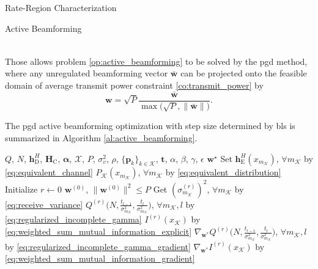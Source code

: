 \documentclass[journal]{IEEEtran}
\begin{document}
\begin{section}{Rate-Region Characterization}
\begin{subsection}{Active Beamforming}
\begin{figure*}[!b]
\begin{align}
				\label{eq:weighted_sum_mutual_information_gradient}
			\end{align}
		\end{figure*}
		Those allows problem \eqref{op:active_beamforming} to be solved by the \gls{pgd} method, where any unregulated beamforming vector $\bar{\boldsymbol{w}}$ can be projected onto the feasible domain of average transmit power constraint \eqref{co:transmit_power} by
		\begin{equation}
			\boldsymbol{w} = \sqrt{P} \frac{\bar{\boldsymbol{w}}}{\max\bigl(\sqrt{P},\lVert\bar{\boldsymbol{w}}\rVert\bigr)}.
			\label{eq:beamforming_projection}
		\end{equation}

		The \gls{pgd} active beamforming optimization with step size determined by \gls{bls} is summarized in Algorithm \ref{al:active_beamforming}.
		\begin{algorithm}[!t]
			\caption{Iterative Active Beamforming Optimization by \gls{pgd} with \gls{bls}}
			\label{al:active_beamforming}
			\begin{algorithmic}[1]
				\Require $Q$, $N$, $\boldsymbol{h}_{\mathrm{D}}^H$, $\boldsymbol{H}_{\mathrm{C}}$, $\boldsymbol{\alpha}$, $\mathcal{X}$, $P$, $\sigma_v^2$, $\rho$, $\{\boldsymbol{p}_k\}_{k \in \mathcal{K}}$, $\boldsymbol{t}$, $\alpha$, $\beta$, $\gamma$, $\epsilon$
				\Ensure $\boldsymbol{w}^\star$
				\State Set $\boldsymbol{h}_{\mathrm{E}}^H(x_{m_{\mathcal{K}}})$, $\forall m_{\mathcal{K}}$ by \eqref{eq:equivalent_channel}
				\State \phantom{Set} $P_{\mathcal{K}}(x_{m_{\mathcal{K}}})$, $\forall m_{\mathcal{K}}$ by \eqref{eq:equivalent_distribution}
				\State Initialize $r \gets 0$
				\State \phantom{Initialize} $\boldsymbol{w}^{(0)}$, $\lVert\boldsymbol{w}^{(0)}\rVert^2 \le P$
				\State Get $(\sigma_{m_{\mathcal{K}}}^{(r)})^2$, $\forall m_{\mathcal{K}}$ by \eqref{eq:receive_variance} \label{st:gradient_descent_begin}
				\State \phantom{Get} $Q^{(r)}\bigl(N,\frac{t_{l-1}}{\sigma_{m_{\mathcal{K}}}^2},\frac{t_l}{\sigma_{m_{\mathcal{K}}}^2}\bigr)$, $\forall m_{\mathcal{K}},l$ by \eqref{eq:regularized_incomplete_gamma}
				\State \phantom{Get} $I^{(r)}(x_{\mathcal{K}})$ by \eqref{eq:weighted_sum_mutual_information_explicit} \label{st:gradient_descent_end}
				\State \phantom{Get} $\nabla_{\boldsymbol{w}^*} Q^{(r)}\bigl(N,\frac{t_{l-1}}{\sigma_{m_{\mathcal{K}}}^2},\frac{t_l}{\sigma_{m_{\mathcal{K}}}^2}\bigr)$, $\forall m_{\mathcal{K}},l$ by \eqref{eq:regularized_incomplete_gamma_gradient} \label{st:gradient_update_start}
				\State \phantom{Get} $\nabla_{\boldsymbol{w}^*} I^{(r)}(x_{\mathcal{K}})$ by \eqref{eq:weighted_sum_mutual_information_gradient} \label{st:gradient_update_end}

\end{algorithmic}
\end{algorithm}
\end{subsection}
\end{section}
\end{document}
